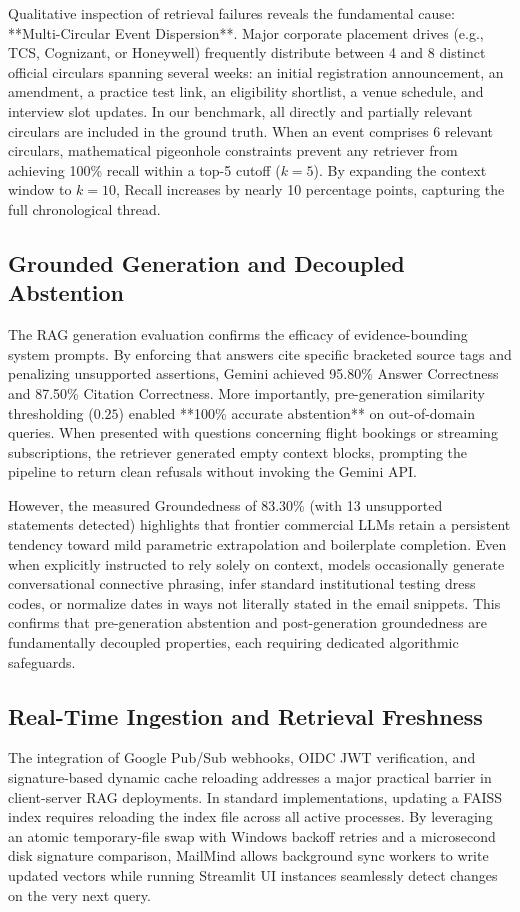 \documentclass[11pt,a4paper]{article}
\begin{document}
Qualitative inspection of retrieval failures reveals the fundamental cause: **Multi-Circular Event Dispersion**. Major corporate placement drives (e.g., TCS, Cognizant, or Honeywell) frequently distribute between 4 and 8 distinct official circulars spanning several weeks: an initial registration announcement, an amendment, a practice test link, an eligibility shortlist, a venue schedule, and interview slot updates. In our benchmark, all directly and partially relevant circulars are included in the ground truth. When an event comprises 6 relevant circulars, mathematical pigeonhole constraints prevent any retriever from achieving 100\% recall within a top-5 cutoff ($k=5$). By expanding the context window to $k=10$, Recall increases by nearly 10 percentage points, capturing the full chronological thread.

\subsection{Grounded Generation and Decoupled Abstention}
The RAG generation evaluation confirms the efficacy of evidence-bounding system prompts. By enforcing that answers cite specific bracketed source tags and penalizing unsupported assertions, Gemini achieved 95.80\% Answer Correctness and 87.50\% Citation Correctness. More importantly, pre-generation similarity thresholding ($0.25$) enabled **100\% accurate abstention** on out-of-domain queries. When presented with questions concerning flight bookings or streaming subscriptions, the retriever generated empty context blocks, prompting the pipeline to return clean refusals without invoking the Gemini API.

However, the measured Groundedness of 83.30\% (with 13 unsupported statements detected) highlights that frontier commercial LLMs retain a persistent tendency toward mild parametric extrapolation and boilerplate completion. Even when explicitly instructed to rely solely on context, models occasionally generate conversational connective phrasing, infer standard institutional testing dress codes, or normalize dates in ways not literally stated in the email snippets. This confirms that pre-generation abstention and post-generation groundedness are fundamentally decoupled properties, each requiring dedicated algorithmic safeguards.

\subsection{Real-Time Ingestion and Retrieval Freshness}
The integration of Google Pub/Sub webhooks, OIDC JWT verification, and signature-based dynamic cache reloading addresses a major practical barrier in client-server RAG deployments. In standard implementations, updating a FAISS index requires reloading the index file across all active processes. By leveraging an atomic temporary-file swap with Windows backoff retries and a microsecond disk signature comparison, MailMind allows background sync workers to write updated vectors while running Streamlit UI instances seamlessly detect changes on the very next query.
\end{document}
